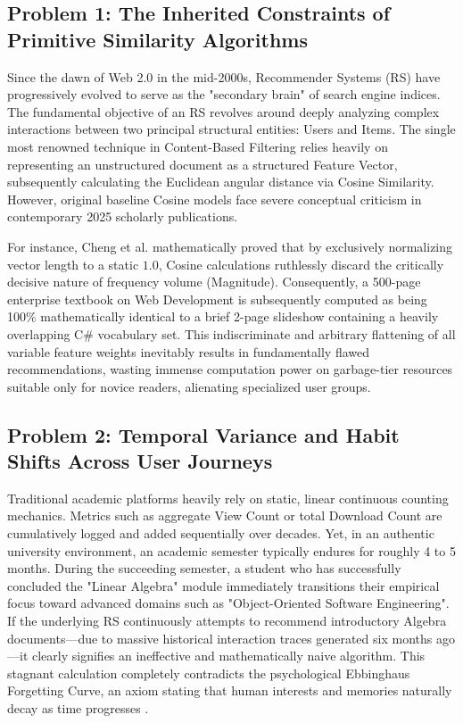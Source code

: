 \documentclass[journal]{IEEEtran}
\begin{document}
\subsection{Problem 1: The Inherited Constraints of Primitive Similarity Algorithms}

Since the dawn of Web 2.0 in the mid-2000s, 
Recommender Systems (RS) have progressively evolved to serve as the "secondary brain" of search engine indices. 
The fundamental objective of an RS revolves around deeply analyzing complex interactions between two principal structural entities: Users and Items. 
The single most renowned technique in Content-Based Filtering relies heavily on representing an unstructured document as a structured Feature Vector, 
subsequently calculating the Euclidean angular distance via Cosine Similarity. 
However, original baseline Cosine models face severe conceptual criticism in contemporary 2025 scholarly publications. 

For instance, Cheng et al. \cite{magnitude2025} mathematically proved that by exclusively normalizing vector length to a static $1.0$, 
Cosine calculations ruthlessly discard the critically decisive nature of frequency volume (Magnitude). 
Consequently, a 500-page enterprise textbook on Web Development is subsequently computed as being 100\% mathematically identical 
to a brief 2-page slideshow containing a heavily overlapping C\# vocabulary set. 
This indiscriminate and arbitrary flattening of all variable feature weights inevitably results in fundamentally flawed recommendations, 
wasting immense computation power on garbage-tier resources suitable only for novice readers, alienating specialized user groups.

\subsection{Problem 2: Temporal Variance and Habit Shifts Across User Journeys}

Traditional academic platforms heavily rely on static, linear continuous counting mechanics. 
Metrics such as aggregate View Count or total Download Count are cumulatively logged and added sequentially over decades. 
Yet, in an authentic university environment, an academic semester typically endures for roughly 4 to 5 months. 
During the succeeding semester, a student who has successfully concluded the "Linear Algebra" module immediately transitions their empirical focus 
toward advanced domains such as "Object-Oriented Software Engineering". 
If the underlying RS continuously attempts to recommend introductory Algebra documents---due to massive historical interaction traces generated six months ago---it clearly signifies an ineffective and mathematically naive algorithm. 
This stagnant calculation completely contradicts the psychological Ebbinghaus Forgetting Curve, 
an axiom stating that human interests and memories naturally decay as time progresses \cite{ebbinghaus_forgetting}.
\end{document}
